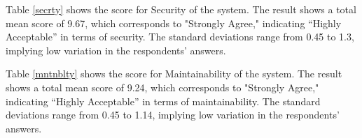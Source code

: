 \documentclass[12pt,a4paper,]{article}
\begin{document}
	Table \ref{secrty} shows the score for Security of the system. The result shows a total mean score of 9.67, which corresponds to "Strongly Agree," indicating “Highly Acceptable” in terms of security. The standard deviations range from 0.45 to 1.3, implying low variation in the respondents’ answers.
	
	\begin{table}[h!]
		\centering
		\caption{Maintainability Evaluation}
		\label{mntnblty}
		\renewcommand{\arraystretch}{1.2}
	\end{table}
	
	Table \ref{mntnblty} shows the score for Maintainability of the system. The result shows a total mean score of 9.24, which corresponds to "Strongly Agree," indicating “Highly Acceptable” in terms of maintainability. The standard deviations range from 0.45 to 1.14, implying low variation in the respondents’ answers.
	
\end{document}
